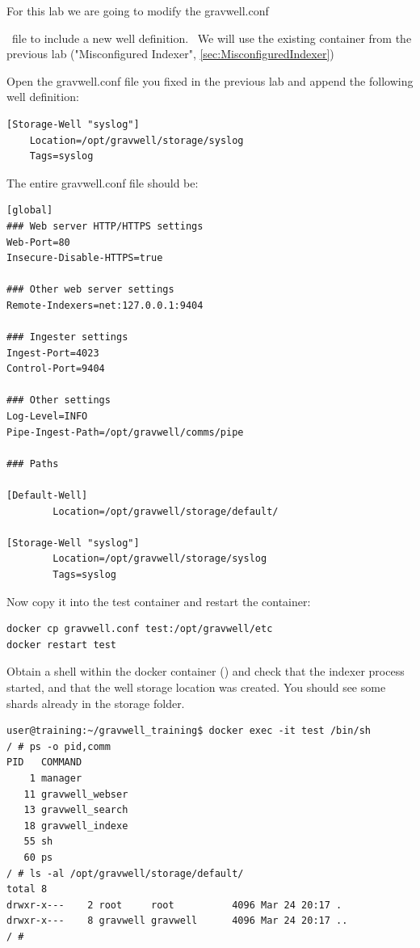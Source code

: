 {For this lab we are going to modify the }{gravwell.conf}{~file to
include a new well definition. ~We will use the existing container from
the previous lab ("Misconfigured Indexer", \ref{sec:MisconfiguredIndexer})

Open the gravwell.conf file you fixed in the previous lab and append the
following well definition:

\begin{Verbatim}[breaklines=true]
[Storage-Well "syslog"]
    Location=/opt/gravwell/storage/syslog
    Tags=syslog
\end{Verbatim}


{The entire gravwell.conf file should be:

\begin{Verbatim}[breaklines=true]
[global]
### Web server HTTP/HTTPS settings
Web-Port=80
Insecure-Disable-HTTPS=true

### Other web server settings
Remote-Indexers=net:127.0.0.1:9404

### Ingester settings
Ingest-Port=4023
Control-Port=9404

### Other settings
Log-Level=INFO
Pipe-Ingest-Path=/opt/gravwell/comms/pipe

### Paths

[Default-Well]
        Location=/opt/gravwell/storage/default/

[Storage-Well "syslog"]
        Location=/opt/gravwell/storage/syslog
        Tags=syslog
\end{Verbatim}

Now copy it into the test container and restart the container:

\begin{Verbatim}[breaklines=true]
docker cp gravwell.conf test:/opt/gravwell/etc
docker restart test
\end{Verbatim}

Obtain a shell within the docker container () and check that the indexer process started, and that the well
storage location was created. You should see some shards already in the
storage folder.

\begin{Verbatim}[breaklines=true]
user@training:~/gravwell_training$ docker exec -it test /bin/sh
/ # ps -o pid,comm
PID   COMMAND
    1 manager
   11 gravwell_webser
   13 gravwell_search
   18 gravwell_indexe
   55 sh
   60 ps
/ # ls -al /opt/gravwell/storage/default/
total 8
drwxr-x---    2 root     root          4096 Mar 24 20:17 .
drwxr-x---    8 gravwell gravwell      4096 Mar 24 20:17 ..
/ #
\end{Verbatim}

}}
